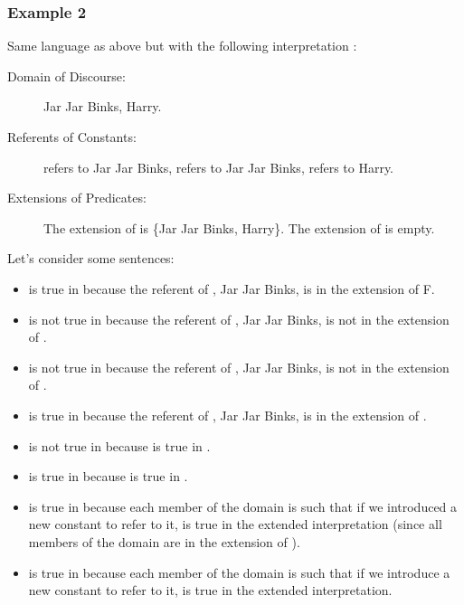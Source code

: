 \subsubsection*{Example 2}

Same language as above but with the following interpretation \model:

\begin{description}

 \item[Domain of Discourse:] Jar Jar Binks, Harry.

 \item[Referents of Constants:]  refers to Jar Jar Binks,  refers to 
  Jar Jar Binks,  refers to Harry.

 \item[Extensions of Predicates:] The extension of  is \{Jar Jar Binks, 
  Harry\}. The extension of  is empty.

\end{description}

Let's consider some sentences:

\begin{itemize}

 \item {} is true in \model{} because the referent of , Jar Jar Binks, 
  is in the extension of F.

 \item {} is not true in \model{}  because the referent of , Jar Jar 
  Binks, is not in the extension of .

 \item {} is not true in \model{}  because the referent of , Jar Jar 
  Binks,  is not in the extension of .

 \item {} is true in \model{}  because the referent of , Jar Jar Binks, 
  is in the extension of .

 \item {} is not true in \model{} because   is true in 
  \model.
   

 \item {} is true in \model{} because  is true in 
  \model.

 \item {} is true in \model{}  because each member  of the domain is such that if we introduced a new constant  to refer to it,   is true in the extended interpretation (since 
  all members of the domain are in the extension of ).
  
 \item {} is true in \model{}  because each member 
   of the domain is such that if we introduce a new constant 
   to refer to it,  
  is true in the extended interpretation.

\end{itemize}


